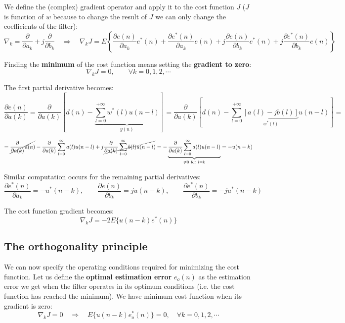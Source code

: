 We define the (complex) gradient operator and apply it to the cost function \( J \) ($J$ is function of $w$ because to change the result of $J$ we can only change the coefficients of the filter):
\[
\nabla_k = \frac{\partial}{\partial a_k} + j \frac{\partial}{\partial b_k}
\quad \Rightarrow \quad
\nabla_k J = E\left\{ \frac{\partial e(n)}{\partial a_k} e^*(n) + \frac{\partial e^*(n)}{\partial a_k} e(n) + j\frac{\partial e(n)}{\partial b_k} e^*(n) + j\frac{\partial e^*(n)}{\partial b_k} e(n) \right\}
\]

Finding the \textbf{minimum} of the cost function means setting the \textbf{gradient to zero}:
\[
\nabla_k J = 0, \qquad \forall k = 0, 1, 2, \cdots
\]


The first partial derivative becomes:
\[
\frac{\partial e(n)}{\partial a(k)} = \frac{\partial}{\partial a(k)} \left[d(n) - \underbrace{\sum_{l=0}^{+\infty}w^*(l) u(n-l)}_{y(n)} \right] = \frac{\partial}{\partial a(k)} \left[d(n) - \sum_{l=0}^{+\infty} \underbrace{\left[a(l)-jb(l)\right]}_{w^*(l)} u(n-l)\right] =
\]

\[
= \cancel{\frac{\partial}{\partial a(k)} d(n)} - \frac{\partial}{\partial a(k)} \sum_{l=0}^{\infty}a(l) u(n-l) + j \cancel{\frac{\partial}{\partial a(k)} \sum_{l=0}^{\infty}b(l) u(n-l)} = - \underbrace{\frac{\partial}{\partial a(k)} \sum_{l=0}^{\infty}a(l) u(n-l)}_{\neq 0 \ \text{for} \ l=k} = -u(n-k)
\]

Similar computation occurs for the remaining partial derivatives:
\[
\frac{\partial e^*(n)}{\partial a_k} = -u^*(n-k), \qquad \frac{\partial e(n)}{\partial b_k} = j u(n-k), \qquad \frac{\partial e^*(n)}{\partial b_k} = -j u^*(n-k)
\]

The cost function gradient becomes: 
\[
\nabla_k J = -2 E\{u(n-k) e^*(n)\}
\]

\subsection{The orthogonality principle}

We can now specify the operating conditions required for minimizing the cost function.
Let us define the \textbf{optimal estimation error} \( e_o(n) \) as the estimation error we get when the filter operates in its optimum conditions (i.e. the cost function has reached the minimum).
We have minimum cost function when its gradient is zero:
\[
\nabla_k J = 0 \quad \Rightarrow \quad E\{u(n-k)e_o^*(n)\} = 0, \quad \forall k = 0, 1, 2, \cdots
\]

